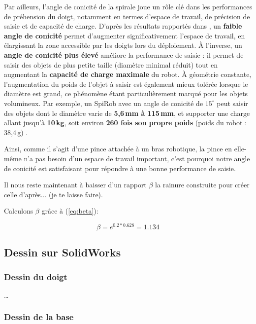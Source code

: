 \documentclass[a4paper, 11pt]{report}
\begin{document}
            Par ailleurs, l'angle de conicité de la spirale joue un rôle clé dans les performances de préhension du doigt, notamment en termes d’espace de travail, de précision de saisie et de capacité de charge. 
            D’après les résultats rapportés dans \cite{wang_spirobs_2025}, un \textbf{faible angle de conicité} permet d’augmenter significativement l’espace de travail, en élargissant la zone accessible par les doigts lors du déploiement. À l’inverse, un \textbf{angle de conicité plus élevé} améliore la performance de saisie : il permet de saisir des objets de plus petite taille (diamètre minimal réduit) tout en augmentant la \textbf{capacité de charge maximale} du robot.
            À géométrie constante, l’augmentation du poids de l’objet à saisir est également mieux tolérée lorsque le diamètre est grand, ce phénomène étant particulièrement marqué pour les objets volumineux. Par exemple, un SpiRob avec un angle de conicité de $15^\circ$ peut saisir des objets dont le diamètre varie de \textbf{5{,}6\,mm à 115\,mm}, et supporter une charge allant jusqu’à \textbf{10\,kg}, soit environ \textbf{260 fois son propre poids} (poids du robot : 38{,}4\,g) \cite{wang_spirobs_2025}.

            Ainsi, comme il s'agit d'une pince attachée à un bras robotique, la pince en elle-même n'a pas besoin d'un espace de travail important, c'est pourquoi notre angle de conicité est satisfaisant pour répondre à une bonne performance de saisie.

            Il nous reste maintenant à baisser d'un rapport $\beta$ la rainure construite pour créer celle d'après... (je te laisse faire).
            
            Calculons $\beta$ grâce à (\ref{eq:beta}):

            \[
            \beta = e^{0.2 * 0.628} = 1.134
            \]

    \subsection{Dessin sur SolidWorks}

        \subsubsection{Dessin du doigt}

            \dots

        \subsubsection{Dessin de la base}
\end{document}
